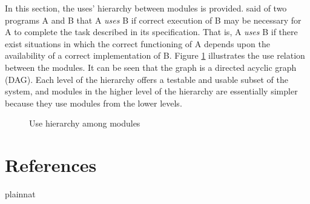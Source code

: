 \documentclass[12pt, titlepage]{article}
\begin{document}
In this section, the uses' hierarchy between modules is
provided. \citet{Parnas1978} said of two programs A and B that A {\em uses} B if
correct execution of B may be necessary for A to complete the task described in
its specification. That is, A {\em uses} B if there exist situations in which
the correct functioning of A depends upon the availability of a correct
implementation of B.  Figure \ref{FigUH} illustrates the use relation between
the modules. It can be seen that the graph is a directed acyclic graph
(DAG). Each level of the hierarchy offers a testable and usable subset of the
system, and modules in the higher level of the hierarchy are essentially simpler
because they use modules from the lower levels.

\begin{figure}[H]
\centering
\caption{Use hierarchy among modules}
\label{FigUH}
\end{figure}

\newpage
\section{References}

 {plainnat}

\end{document}
